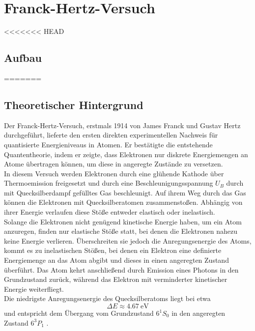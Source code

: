\chapter{Franck-Hertz-Versuch}

<<<<<<< HEAD
\section{Aufbau}
=======

\section{Theoretischer Hintergrund}
Der Franck-Hertz-Versuch, erstmals 1914 von James Franck und Gustav Hertz durchgeführt, lieferte den ersten direkten experimentellen Nachweis für quantisierte Energieniveaus in Atomen. Er bestätigte die entstehende Quantentheorie, indem er zeigte, dass Elektronen nur diskrete Energiemengen an Atome übertragen können, um diese in angeregte Zustände zu versetzen.
\vspace{0.3cm}\\
In diesem Versuch werden Elektronen durch eine glühende Kathode über Thermoemission freigesetzt und durch eine Beschleunigungsspannung $U_B$ durch mit Quecksilberdampf gefülltes Gas beschleunigt. Auf ihrem Weg durch das Gas können die Elektronen mit Quecksilberatomen zusammenstoßen. Abhängig von ihrer Energie verlaufen diese Stöße entweder elastisch oder inelastisch.
\vspace{0.3cm}\\
Solange die Elektronen nicht genügend kinetische Energie haben, um ein Atom anzuregen, finden nur elastische Stöße statt, bei denen die Elektronen nahezu keine Energie verlieren. Überschreiten sie jedoch die Anregungsenergie des Atoms, kommt es zu inelastischen Stößen, bei denen ein Elektron eine definierte Energiemenge an das Atom abgibt und dieses in einen angeregten Zustand überführt. Das Atom kehrt anschließend durch Emission eines Photons in den Grundzustand zurück, während das Elektron mit verminderter kinetischer Energie weiterfliegt.
\vspace{0.3cm}\\
Die niedrigste Anregungsenergie des Quecksilberatoms liegt bei etwa
\begin{equation}
\Delta E \approx \SI{4.67}{\electronvolt} 
\end{equation}
und entspricht dem Übergang vom Grundzustand $6^1S_0$ in den angeregten Zustand $6^3P_1$ \cite{Hg_excitationEnergy}.
